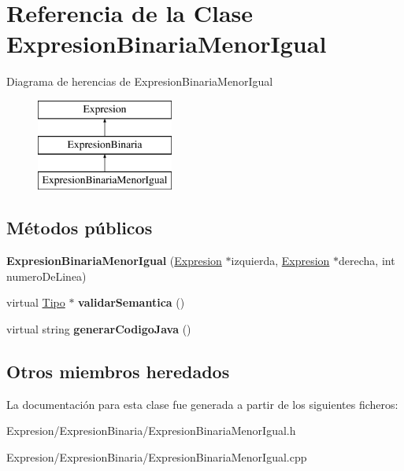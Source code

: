 \hypertarget{class_expresion_binaria_menor_igual}{\section{Referencia de la Clase Expresion\-Binaria\-Menor\-Igual}
\label{class_expresion_binaria_menor_igual}
}
Diagrama de herencias de Expresion\-Binaria\-Menor\-Igual\begin{figure}[H]
\begin{center}
\leavevmode
\includegraphics[height=3.000000cm]{class_expresion_binaria_menor_igual}
\end{center}
\end{figure}
\subsection*{Métodos públicos}
\begin{DoxyCompactItemize}
\item 
\hypertarget{class_expresion_binaria_menor_igual_a9ded70cedc472b5ef937015548bd89d7}{{\bfseries Expresion\-Binaria\-Menor\-Igual} (\hyperlink{class_expresion}{Expresion} $\ast$izquierda, \hyperlink{class_expresion}{Expresion} $\ast$derecha, int numero\-De\-Linea)}\label{class_expresion_binaria_menor_igual_a9ded70cedc472b5ef937015548bd89d7}

\item 
\hypertarget{class_expresion_binaria_menor_igual_af35c44bcf153a717ed899f82cfe16330}{virtual \hyperlink{class_tipo}{Tipo} $\ast$ {\bfseries validar\-Semantica} ()}\label{class_expresion_binaria_menor_igual_af35c44bcf153a717ed899f82cfe16330}

\item 
\hypertarget{class_expresion_binaria_menor_igual_a50bcd6f34a0c87c074d796bd9df3983a}{virtual string {\bfseries generar\-Codigo\-Java} ()}\label{class_expresion_binaria_menor_igual_a50bcd6f34a0c87c074d796bd9df3983a}

\end{DoxyCompactItemize}
\subsection*{Otros miembros heredados}


La documentación para esta clase fue generada a partir de los siguientes ficheros\-:\begin{DoxyCompactItemize}
\item 
Expresion/\-Expresion\-Binaria/Expresion\-Binaria\-Menor\-Igual.\-h\item 
Expresion/\-Expresion\-Binaria/Expresion\-Binaria\-Menor\-Igual.\-cpp\end{DoxyCompactItemize}
